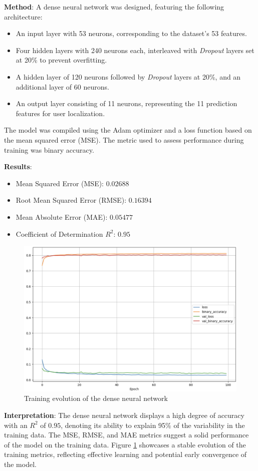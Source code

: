 \documentclass[conference]{IEEEtran}
\begin{document}
\textbf{Method}: A dense neural network was designed, featuring the following architecture:
\begin{itemize}
    \item An input layer with 53 neurons, corresponding to the dataset's 53 features.
    \item Four hidden layers with 240 neurons each, interleaved with \textit{Dropout} layers set at 20\% to prevent overfitting.
    \item A hidden layer of 120 neurons followed by \textit{Dropout} layers at 20\%, and an additional layer of 60 neurons.
    \item An output layer consisting of 11 neurons, representing the 11 prediction features for user localization.
\end{itemize}

The model was compiled using the Adam optimizer and a loss function based on the mean squared error (MSE). The metric used to assess performance during training was binary accuracy.

\textbf{Results}:
\begin{itemize}
    \item Mean Squared Error (MSE): $0.02688$
    \item Root Mean Squared Error (RMSE): $0.16394$
    \item Mean Absolute Error (MAE): $0.05477$
    \item Coefficient of Determination $R^2$: $0.95$
\end{itemize}

\begin{figure}[h]
    \centering
    \includegraphics[width=0.5\linewidth]{REDNEURONAL1.png}
    \caption{Training evolution of the dense neural network}
    \label{fig:nn_training_evolution}
\end{figure}

\textbf{Interpretation}: The dense neural network displays a high degree of accuracy with an $R^2$ of $0.95$, denoting its ability to explain 95\% of the variability in the training data. The MSE, RMSE, and MAE metrics suggest a solid performance of the model on the training data. Figure \textcolor{blue}{\ref{fig:nn_training_evolution}} showcases a stable evolution of the training metrics, reflecting effective learning and potential early convergence of the model.
\end{document}
